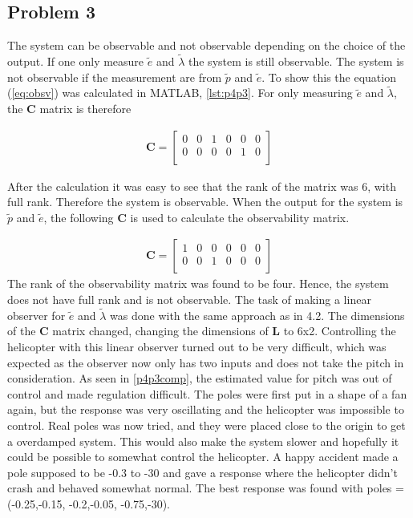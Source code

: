 \subsection{Problem 3}
The system can be observable and not observable depending on the choice of the output. If one only measure $\tilde{e}$ and $\tilde{\lambda}$ the system is still observable. The system is not observable if the measurement are from $\tilde{p}$ and $\tilde{e}$. To show this the equation (\ref{eq:obsv}) was calculated in MATLAB, \eqref{lst:p4p3}. For only measuring $\tilde{e}$ and $\tilde{\lambda}$, the \textbf{C} matrix is therefore

\begin{subequations}
\begin{align*}
\textbf{C} = \begin{bmatrix*}
    0 & 0 & 1 & 0 & 0 & 0\\
        0 & 0 & 0 & 0 & 1 &0\\
        \end{bmatrix*}
\end{align*}
\end{subequations}

After the calculation it was easy to see that the rank of the matrix was 6, with full rank. Therefore the system is observable. When the output for the system is $\tilde{p}$ and $\tilde{e}$, the following \textbf{C} is used to calculate the observability matrix.

\begin{subequations}
\begin{align*}
\textbf{C} = \begin{bmatrix*}
        1 & 0 & 0 & 0 & 0 & 0\\
        0 & 0 & 1 & 0 & 0 &0\\
        \end{bmatrix*}
\end{align*}
\end{subequations}
The rank of the observability matrix was found to be four. Hence, the system does not have full rank and is not observable. 
\newline\newline
The task of making a linear observer for $\tilde{e}$ and $\tilde{\lambda}$ was done with the same approach as in 4.2. The dimensions of the \textbf{C} matrix changed, changing the dimensions of \textbf{L} to 6x2. Controlling the helicopter with this linear observer turned out to be very difficult, which was expected as the observer now only has two inputs and does not take the pitch in consideration. As seen in \cref{p4p3comp}, the estimated value for pitch was out of control and made regulation difficult. The poles were first put in a shape of a fan again, but the response was very oscillating and the helicopter was impossible to control. Real poles was now tried, and they were placed close to the origin to get a overdamped system. This would also make the system slower and hopefully it could be possible to somewhat control the helicopter. A happy accident made a pole supposed to be -0.3 to -30 and gave a response where the helicopter didn't crash and behaved somewhat normal. The best response was found with poles = (-0.25,-0.15, -0.2,-0.05, -0.75,-30).

